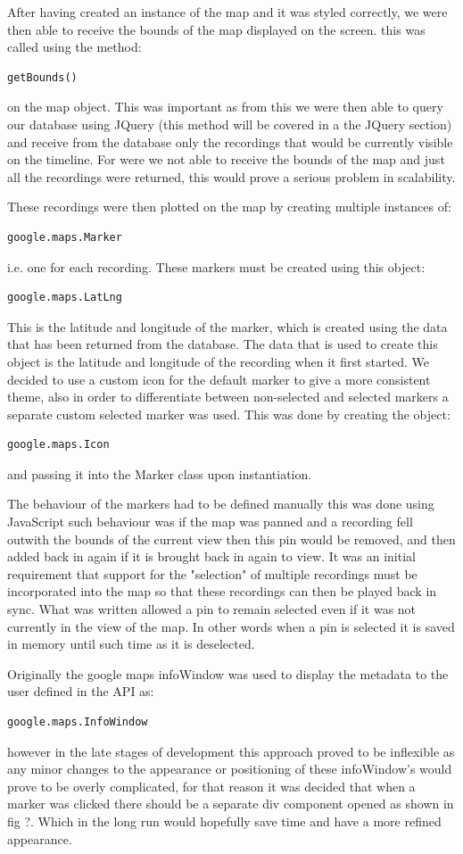 \documentclass{l3proj}
\begin{document}
After having created an instance of the map and it was styled correctly, we were then able to receive the bounds of the map displayed on the screen. this was called using the method:
\begin{verbatim}
getBounds()
\end{verbatim}
on the map object. This was important as from this we were then able to query our database using JQuery (this method will be covered in a the JQuery section) and receive from the database only the recordings that would be currently visible on the timeline. For were we not able to receive the bounds of the map and just all the recordings were returned, this would prove a serious problem in scalability.

These recordings were then plotted on the map by creating multiple instances of:
\begin{verbatim}
google.maps.Marker
\end{verbatim}
i.e. one for each recording. These markers must be created using this object:
\begin{verbatim}
google.maps.LatLng
\end{verbatim}
This is the latitude and longitude of the marker, which is created using the data that has been returned from the database. The data that is used to create this object is the latitude and longitude of the recording when it first started. We decided to use a custom icon for the default marker to give a more consistent theme, also in order to differentiate between non-selected and selected markers a separate custom selected marker was used. This was done by creating the object:
\begin{verbatim}
google.maps.Icon
\end{verbatim}
and passing it into the Marker class upon instantiation.

The behaviour of the markers had to be defined manually this was done using JavaScript such behaviour was if the map was panned and a recording fell outwith the bounds of the current view then this pin would be removed, and then added back in again if it is brought back in again to view. It was an initial requirement that support for the "selection" of multiple recordings must be incorporated into the map so that these recordings can then be played back in sync. What was written allowed a pin to remain selected even if it was not currently in the view of the map. In other words when a pin is selected it is saved in memory until such time as it is deselected.

Originally the google maps infoWindow was used to display the metadata to the user defined in the API as:
\begin{verbatim}
google.maps.InfoWindow
\end{verbatim}
however in the late stages of development this approach proved to be inflexible as any minor changes to the appearance or positioning of these infoWindow’s would prove to be overly complicated, for that reason it was decided that when a marker was clicked there should be a separate div component opened as shown in fig ?. Which in the long run would hopefully save time and have a more refined appearance.
\end{document}
